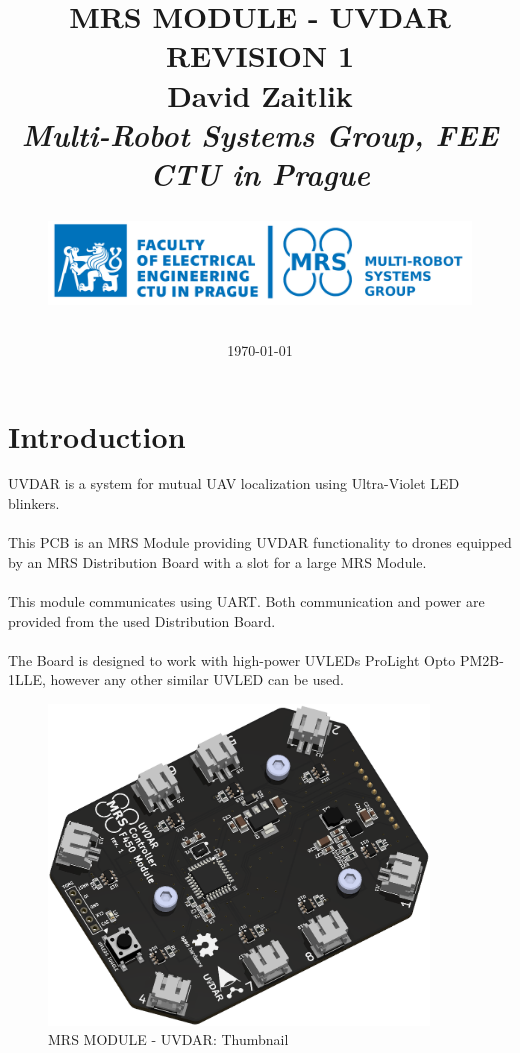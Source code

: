 \documentclass[12pt, a4paper]{article}
\title{
\Huge{MRS MODULE - UVDAR}\\
REVISION 1\\
\vspace{0.5cm}
\LARGE{David Zaitlik}\\
\vspace{0.5cm}
\normalsize{\textit{Multi-Robot Systems Group, FEE CTU in Prague}}\\
\vspace{1.5cm}
\vfill
\begin{figure}[h]
\centering
\includegraphics[width=\textwidth]{figures/logo_CTU_FEE_MRS_blue.png}
\end{figure}
\date{\today}

}
\begin{document}
\clearpage
\maketitle
\thispagestyle{empty}

\pagebreak
\tableofcontents
\listoffigures
\listoftables
\thispagestyle{empty}

\pagebreak
\setcounter{page}{1}
\section{Introduction}
UVDAR is a system for mutual UAV localization using Ultra-Violet LED blinkers.\\
\\
This PCB is an MRS Module providing UVDAR functionality to drones equipped by an MRS Distribution Board with a slot for a large MRS Module.\\
\\
This module communicates using UART. Both communication and power are provided from the used Distribution Board.\\
\\
The Board is designed to work with high-power UVLEDs ProLight Opto PM2B-1LLE, however any other similar UVLED can be used.\\
\begin{figure}[h]
\centering
\includegraphics[width=0.9\textwidth]{figures/Thumbnail.png}
\caption{MRS MODULE - UVDAR: Thumbnail}
\label{fig:thumbnail}
\end{figure}

\pagebreak
\end{document}
